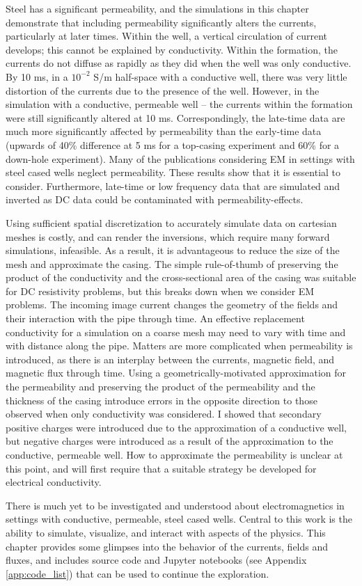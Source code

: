 Steel has a significant permeability, and the simulations in this chapter demonstrate that including permeability significantly alters the currents, particularly at later times. Within the well, a vertical circulation of current develops; this cannot be explained by conductivity. Within the formation, the currents do not diffuse as rapidly as they did when the well was only conductive. By 10 ms, in a $10^{-2}$ S/m half-space with a conductive well, there was very little distortion of the currents due to the presence of the well. However, in the simulation with a conductive, permeable well -- the currents within the formation were still significantly altered at 10 ms. Correspondingly, the late-time data are much more significantly affected by permeability than the early-time data (upwards of 40\% difference at 5 ms for a top-casing experiment and 60\% for a down-hole experiment). Many of the publications considering EM in settings with steel cased wells neglect permeability. These results show that it is essential to consider. Furthermore, late-time or low frequency data that are simulated and inverted as DC data could be contaminated with permeability-effects.

Using sufficient spatial discretization to accurately simulate data on cartesian meshes is costly, and can render the inversions, which require many forward simulations, infeasible. As a result, it is advantageous to reduce the size of the mesh and approximate the casing.
The simple rule-of-thumb of preserving the product of the conductivity and the cross-sectional area of the casing was suitable for DC resistivity problems, but this breaks down when we consider EM problems. The incoming image current changes the geometry of the fields and their interaction with the pipe through time. An effective replacement conductivity for a simulation on a coarse mesh may need to vary with time and with distance along the pipe. Matters are more complicated when permeability is introduced, as there is an interplay between the currents, magnetic field, and magnetic flux through time. Using a geometrically-motivated approximation for the permeability and preserving the product of the permeability and the thickness of the casing introduce errors in the opposite direction to those observed when only conductivity was considered. I showed that secondary positive charges were introduced due to the approximation of a conductive well, but negative charges were introduced as a result of the approximation to the conductive, permeable well. How to approximate the permeability is unclear at this point, and will first require that a suitable strategy be developed for electrical conductivity.

There is much yet to be investigated and understood about electromagnetics in settings with conductive, permeable, steel cased wells. Central to this work is the ability to simulate, visualize, and interact with aspects of the physics. This chapter provides some glimpses into the behavior of the currents, fields and fluxes, and includes source code and Jupyter notebooks (see Appendix \ref{app:code_list}) that can be used to continue the exploration.

